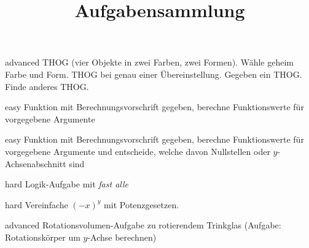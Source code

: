 \documentclass[]{uebungsblatt}
\title{Aufgabensammlung}
\begin{document}
    \maketitle
    \makepreamble
    
    \begin{exercise}{advanced}
        THOG (vier Objekte in zwei Farben, zwei Formen). Wähle geheim Farbe und Form. THOG bei genau einer 
        Übereinstellung. Gegeben ein THOG. Finde anderes THOG.
    \end{exercise}

    \begin{exercise}{easy}
        Funktion mit Berechnungsvorschrift gegeben, berechne Funktionswerte für vorgegebene Argumente
    \end{exercise}

    \begin{exercise}{easy}
        Funktion mit Berechnungsvorschrift gegeben, berechne Funktionswerte für vorgegebene Argumente und entscheide,
        welche davon Nullstellen oder $y$-Achsenabschnitt sind
    \end{exercise}

    \begin{exercise}{hard}
        Logik-Aufgabe mit \emph{fast alle}
    \end{exercise}

    \begin{exercise}{hard}
        Vereinfache $(-x)^y$ mit Potenzgesetzen.
    \end{exercise}

    \begin{exercise}{advanced}
        Rotationsvolumen-Aufgabe zu rotierendem Trinkglas (Aufgabe: Rotationskörper um $y$-Achse berechnen)
    \end{exercise}
\end{document}
